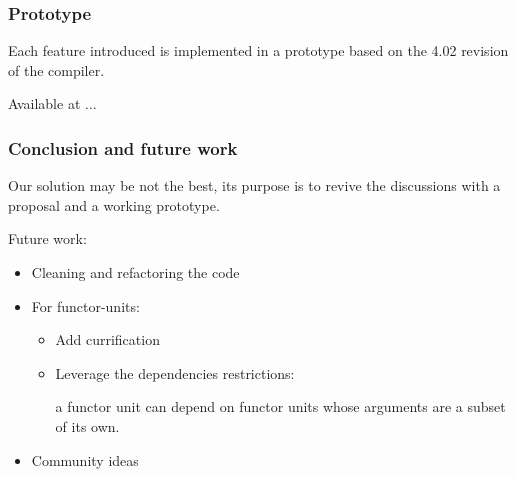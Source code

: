 \documentclass{beamer}
\begin{document}
\begin{frame}
\frametitle{Prototype}

Each feature introduced is implemented in a prototype based on the 4.02
revision of the compiler.

Available at ... 
\end{frame}

\begin{frame}
\frametitle{Conclusion and future work}

Our solution may be not the best, its purpose is to revive the discussions with
a proposal and a working prototype. 

\medskip

Future work:
\begin{itemize}
  \item Cleaning and refactoring the code
  \item For functor-units:
    \begin{itemize}
      \item Add currification
      \item Leverage the dependencies restrictions:

        a functor unit can depend on functor units whose arguments are a subset
        of its own.
    \end{itemize}
  \item Community ideas
\end{itemize}
\end{frame}
\end{document}
